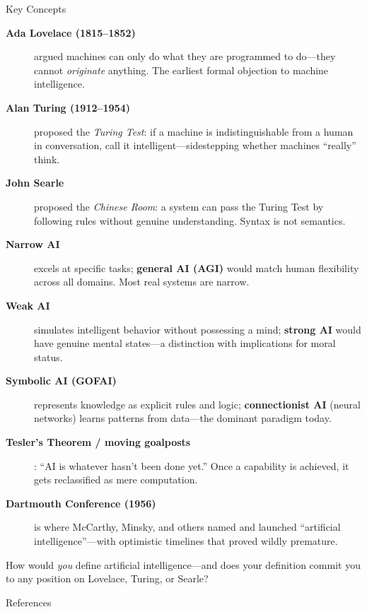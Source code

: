 ﻿\documentclass[aspectratio=169,11pt]{beamer}
\begin{document}
\begin{frame}[allowframebreaks]{Key Concepts}
\footnotesize
\begin{description}
    \item[\textbf{Ada Lovelace (1815--1852)}] argued machines can only do what they are programmed to do---they cannot \textit{originate} anything. The earliest formal objection to machine intelligence.
    \item[\textbf{Alan Turing (1912--1954)}] proposed the \textit{Turing Test}: if a machine is indistinguishable from a human in conversation, call it intelligent---sidestepping whether machines ``really'' think.
    \item[\textbf{John Searle}] proposed the \textit{Chinese Room}: a system can pass the Turing Test by following rules without genuine understanding. Syntax is not semantics.
    \item[\textbf{Narrow AI}] excels at specific tasks; \textbf{general AI (AGI)} would match human flexibility across all domains. Most real systems are narrow.
    \item[\textbf{Weak AI}] simulates intelligent behavior without possessing a mind; \textbf{strong AI} would have genuine mental states---a distinction with implications for moral status.
    \item[\textbf{Symbolic AI (GOFAI)}] represents knowledge as explicit rules and logic; \textbf{connectionist AI} (neural networks) learns patterns from data---the dominant paradigm today.
    \item[\textbf{Tesler's Theorem / moving goalposts}]: ``AI is whatever hasn't been done yet.'' Once a capability is achieved, it gets reclassified as mere computation.
    \item[\textbf{Dartmouth Conference (1956)}] is where McCarthy, Minsky, and others named and launched ``artificial intelligence''---with optimistic timelines that proved wildly premature.
\end{description}

\begin{discussionbox}[Discussion]
How would \emph{you} define artificial intelligence---and does your definition commit you to any position on Lovelace, Turing, or Searle?
\end{discussionbox}
\end{frame}

\begin{frame}[allowframebreaks]{References}
\printbibliography[heading=none]
\end{frame}
\end{document}
